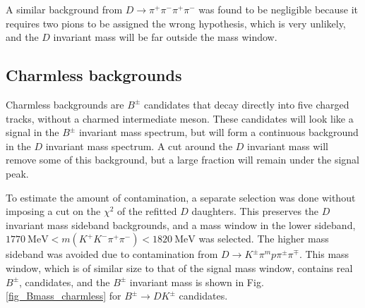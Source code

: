 \documentclass[12pt, a4paper, notitlepage, onecolumn]{article}
\numberwithin{equation}{section}
\begin{document}
A similar background from $D\to\pi^+\pi^-\pi^+\pi^-$ was found to be negligible because it requires two pions to be assigned the wrong hypothesis, which is very unlikely, and the $D$ invariant mass will be far outside the mass window.

\subsection{Charmless backgrounds}
\label{subsection_charmless}
\noindent Charmless backgrounds are $B^\pm$ candidates that decay directly into five charged tracks, without a charmed intermediate meson. These candidates will look like a signal in the $B^\pm$ invariant mass spectrum, but will form a continuous background in the $D$ invariant mass spectrum. A cut around the $D$ invariant mass will remove some of this background, but a large fraction will remain under the signal peak.

To estimate the amount of contamination, a separate selection was done without imposing a cut on the $\chi^2$ of the refitted $D$ daughters. This preserves the $D$ invariant mass sideband backgrounds, and a mass window in the lower sideband, $\SI{1770}{\mega\eV} < m(K^+K^-\pi^+\pi^-) < \SI{1820}{\mega\eV}$ was selected. The higher mass sideband was avoided due to contamination from $D\to K^\pm\pi^mp\pi^\pm\pi^\mp$. This mass window, which is of similar size to that of the signal mass window, contains real $B^\pm$, candidates, and the $B^\pm$ invariant mass is shown in Fig. \ref{fig_Bmass_charmless} for $B^\pm\to DK^\pm$ candidates.
\end{document}
